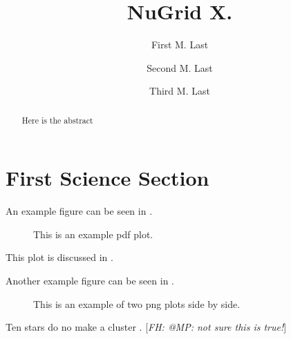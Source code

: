 \documentclass[twocolumn]{aastex61}
\newcommand{\fhcom}[1]{{\color{PineGreen}[\emph{FH: #1}]}}
\begin{document}
\title{NuGrid X. }
\author{First M. Last}

\author{Second  M. Last}

\author{Third M. Last}




\begin{abstract}
  Here is the abstract
\end{abstract}

\keywords{}

\section{First Science Section}\label{s.science1} 


An example figure can be seen in .
\begin{figure}[ht!]
\caption{\label{fig:general}
This is an example pdf plot.}
\end{figure}

This plot is discussed in \citet{lau:12}.

Another example figure can be seen in .
\begin{figure*}[ht!]
\caption{This is an example of two png plots side by side.
  \label{fig:two-plotexample}}
\end{figure*}

Ten stars do no make a cluster \citep{2001A&A...369..574V}.
\fhcom{@MP: not sure this is true!}






\end{document}
